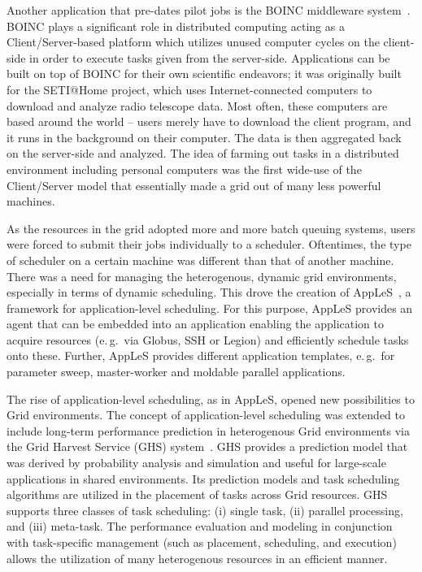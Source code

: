 \documentclass{sig-alternate}
\begin{document}
Another application that pre-dates pilot jobs is the BOINC middleware system~\cite{Anderson:2004:BSP:1032646.1033223}. BOINC plays a significant role in distributed computing acting as a Client/Server-based platform which utilizes unused computer cycles on the client-side in order to execute tasks given from the server-side. Applications can be built on top of BOINC for their own scientific endeavors; it was originally built for the SETI@Home project, which uses Internet-connected computers to download and analyze radio telescope data. Most often, these computers are based around the world -- users merely have to download the client program, and it runs in the background on their computer. The data is then aggregated back on the server-side and analyzed. The idea of farming out tasks in a distributed environment including personal computers was the first wide-use of the Client/Server model that essentially made a grid out of many less powerful machines.

As the resources in the grid adopted more and more batch queuing systems, users were forced to submit their jobs individually to a scheduler. Oftentimes, the type of scheduler on a certain machine was different than that of another machine. There was a need for managing the heterogenous, dynamic grid environments, especially in terms of dynamic scheduling. This drove the creation of AppLeS~\cite{Berman:2003:ACG:766629.766632}, a framework for 
application-level scheduling. For this purpose, AppLeS provides an agent that 
can be embedded into an application enabling the application to acquire 
resources (e.\,g.\ via Globus, SSH or Legion) and efficiently schedule tasks 
onto these. Further, AppLeS provides different application templates,
e.\,g.\ for parameter sweep, master-worker and moldable parallel applications.

The rise of application-level scheduling, as in AppLeS, opened new possibilities to Grid environments. The concept of application-level scheduling was extended to include long-term performance prediction in heterogenous Grid environments via the Grid Harvest Service (GHS) system~\cite{ghs}. GHS provides a prediction model that was derived by probability analysis and simulation and useful for large-scale applications in shared environments. Its prediction models and task scheduling algorithms are utilized in the placement of tasks across Grid resources. GHS supports three classes of task scheduling: (i) single task, (ii) parallel processing, and (iii) meta-task. The performance evaluation and modeling in conjunction with task-specific management (such as placement, scheduling, and execution) allows the utilization of many heterogenous resources in an efficient manner.
\end{document}
